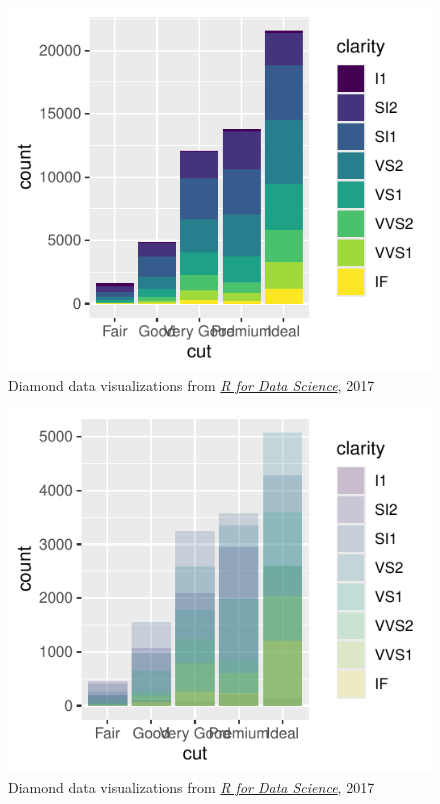 \documentclass[
  letterpaper,
  DIV=11,
  numbers=noendperiod]{scrreprt}
\begin{document}
\begin{figure}[H]

{\centering \includegraphics{src/03-Effective_Viz_files/figure-pdf/unnamed-chunk-11-2.pdf}

}

\caption{Diamond data visualizations from
\href{http://r4ds.had.co.nz/data-visualisation.html\#position-adjustments}{\emph{R
for Data Science}}, 2017}

\end{figure}%

\begin{figure}[H]

{\centering \includegraphics{src/03-Effective_Viz_files/figure-pdf/unnamed-chunk-11-3.pdf}

}

\caption{Diamond data visualizations from
\href{http://r4ds.had.co.nz/data-visualisation.html\#position-adjustments}{\emph{R
for Data Science}}, 2017}

\end{figure}%
\end{document}
